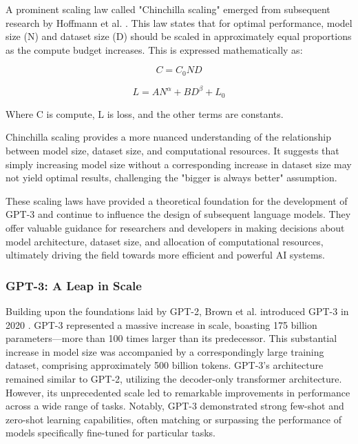 \documentclass[a4paper, oneside]{discothesis}
\begin{document}
A prominent scaling law called "Chinchilla scaling" emerged from subsequent research by Hoffmann et al. \cite{hoffmann2022training}. This law states that for optimal performance, model size (N) and dataset size (D) should be scaled in approximately equal proportions as the compute budget increases. This is expressed mathematically as:

\begin{equation}
C = C_0ND
\end{equation}

\begin{equation}
L = AN^\alpha + BD^\beta + L_0
\end{equation}

Where C is compute, L is loss, and the other terms are constants.

Chinchilla scaling provides a more nuanced understanding of the relationship between model size, dataset size, and computational resources. It suggests that simply increasing model size without a corresponding increase in dataset size may not yield optimal results, challenging the "bigger is always better" assumption.

These scaling laws have provided a theoretical foundation for the development of GPT-3 and continue to influence the design of subsequent language models. They offer valuable guidance for researchers and developers in making decisions about model architecture, dataset size, and allocation of computational resources, ultimately driving the field towards more efficient and powerful AI systems.

\subsubsection{GPT-3: A Leap in Scale}
Building upon the foundations laid by GPT-2, Brown et al. introduced GPT-3 in 2020 \cite{brown2020language}. 
GPT-3 represented a massive increase in scale, boasting 175 billion parameters—more than 100 times larger than its predecessor. 
This substantial increase in model size was accompanied by a correspondingly large training dataset, comprising approximately 500 billion tokens.
GPT-3's architecture remained similar to GPT-2, utilizing the decoder-only transformer architecture. 
However, its unprecedented scale led to remarkable improvements in performance across a wide range of tasks. Notably, GPT-3 demonstrated strong few-shot and zero-shot learning capabilities, often matching or surpassing the performance of models specifically fine-tuned for particular tasks.
\end{document}
